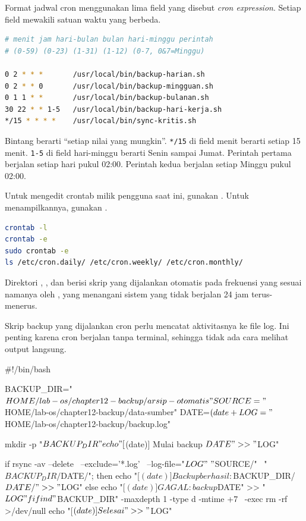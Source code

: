 Format jadwal cron menggunakan lima field yang disebut \emph{cron expression}.
Setiap field mewakili satuan waktu yang berbeda.

\begin{lstlisting}[language=bash, caption={Format cron expression dan contoh jadwal}]
# menit jam hari-bulan bulan hari-minggu perintah
# (0-59) (0-23) (1-31) (1-12) (0-7, 0&7=Minggu)

0 2 * * *       /usr/local/bin/backup-harian.sh
0 2 * * 0       /usr/local/bin/backup-mingguan.sh
0 1 1 * *       /usr/local/bin/backup-bulanan.sh
30 22 * * 1-5   /usr/local/bin/backup-hari-kerja.sh
*/15 * * * *    /usr/local/bin/sync-kritis.sh
\end{lstlisting}

Bintang berarti ``setiap nilai yang mungkin''. \texttt{*/15} di field menit
berarti setiap 15 menit. \texttt{1-5} di field hari-minggu berarti Senin sampai
Jumat. Perintah pertama berjalan setiap hari pukul 02:00. Perintah kedua berjalan
setiap Minggu pukul 02:00.

Untuk mengedit crontab milik pengguna saat ini, gunakan .
Untuk menampilkannya, gunakan .

\begin{lstlisting}[language=bash, caption={Mengelola crontab}]
crontab -l
crontab -e
sudo crontab -e
ls /etc/cron.daily/ /etc/cron.weekly/ /etc/cron.monthly/
\end{lstlisting}

Direktori , , dan
 berisi skrip yang dijalankan otomatis pada frekuensi
yang sesuai namanya oleh , yang menangani sistem yang tidak berjalan
24 jam terus-menerus.

Skrip backup yang dijalankan cron perlu mencatat aktivitasnya ke file log. Ini
penting karena cron berjalan tanpa terminal, sehingga tidak ada cara melihat
output langsung.

\begin{longlisting}[language=bash, caption={Contoh skrip backup dengan logging}]
#!/bin/bash

BACKUP_DIR="$HOME/lab-os/chapter12-backup/arsip-otomatis"
SOURCE="$HOME/lab-os/chapter12-backup/data-sumber"
DATE=$(date +%
LOG="$HOME/lab-os/chapter12-backup/backup.log"

mkdir -p "$BACKUP_DIR"

echo "[$(date)] Mulai backup $DATE" >> "$LOG"

if rsync -av --delete \
    --exclude='*.log' \
    --log-file="$LOG" \
    "$SOURCE/" \
    "$BACKUP_DIR/$DATE/"; then
    echo "[$(date)] Backup berhasil: $BACKUP_DIR/$DATE/" >> "$LOG"
else
    echo "[$(date)] GAGAL: backup $DATE" >> "$LOG"
fi

find "$BACKUP_DIR" -maxdepth 1 -type d -mtime +7 \
    -exec rm -rf {} >/dev/null
echo "[$(date)] Selesai" >> "$LOG"
\end{longlisting}

